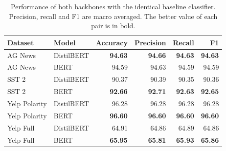 \begin{table}[t]
\centering
\footnotesize
\caption{Performance of both backbones with the identical baseline classifier. Precision, recall and F1 are macro averaged. The better value of each pair is in bold.}
\label{tab:main}
\begin{tabular}{llrrrr}
\toprule
Dataset & Model & Accuracy & Precision & Recall & F1 \\
\midrule
AG News & DistilBERT & \textbf{94.63} & \textbf{94.66} & \textbf{94.63} & \textbf{94.63} \\
AG News & BERT & 94.59 & 94.63 & 94.59 & 94.59 \\
\addlinespace
SST 2 & DistilBERT & 90.37 & 90.39 & 90.35 & 90.36 \\
SST 2 & BERT & \textbf{92.66} & \textbf{92.71} & \textbf{92.63} & \textbf{92.65} \\
\addlinespace
Yelp Polarity & DistilBERT & 96.28 & 96.28 & 96.28 & 96.28 \\
Yelp Polarity & BERT & \textbf{96.60} & \textbf{96.60} & \textbf{96.60} & \textbf{96.60} \\
\addlinespace
Yelp Full & DistilBERT & 64.91 & 64.86 & 64.89 & 64.86 \\
Yelp Full & BERT & \textbf{65.95} & \textbf{65.81} & \textbf{65.93} & \textbf{65.86} \\
\bottomrule
\end{tabular}
\end{table}
